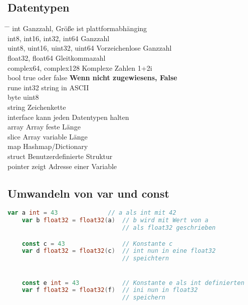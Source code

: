 \documentclass[twoside,a4paper,12pt]{article}
\begin{document}
\subsection{Datentypen}
\begin{tabbing}
 \hspace{2mm} \= \hspace{50mm} \= \kill
 \> int \> Ganzzahl, Größe ist plattformabhänging \\
 \> int8, int16, int32, int64 \> Ganzzahl \\
 \> uint8, uint16, uint32, uint64 \> Vorzeichenlose Ganzzahl \\
 \> float32, float64 \> Gleitkommazahl \\ 
 \> complex64, complex128 \> Komplexe Zahlen 1+2i \\
 \> bool \> true oder false \textbf{Wenn nicht zugewiesens, False} \\ 
 \> rune \> int32 string in ASCII\\ 
 \> byte \> uint8 \\
 \> string \> Zeichenkette \\ 
 \> interface{} \> kann jeden Datentypen halten \\
 \> array \> Array feste Länge \\ 
 \> slice \> Array variable Länge \\ 
 \> map \> Hashmap/Dictionary \\ 
 \> struct \> Benutzerdefinierte Struktur \\ 
 \> pointer \> zeigt Adresse einer Variable \\
 \end{tabbing}

\subsection{Umwandeln von var und const}
\begin{center}
  \begin{minipage}{1.0\textwidth}
    \begin{lstlisting}[language=Go]
    var a int = 43              // a als int mit 42
    var b float32 = float32(a)  // b wird mit Wert von a
                                // als float32 geschrieben

    const c = 43                // Konstante c
    var d float32 = float32(c)  // int nun in eine float32
                                // speichtern


    const e int = 43            // Konstante e als int definierten
    var f float32 = float32(f)  // ini nun in float32 
                                // speichern
    \end{lstlisting}
  \end{minipage}
\end{center}  
\end{document}
